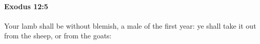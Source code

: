
		\paragraph{Exodus 12:5} %
			\label{EXODUS-12-5}

			Your lamb shall be without blemish, a male of the first year: ye shall take it out from the sheep, or from the goats:


